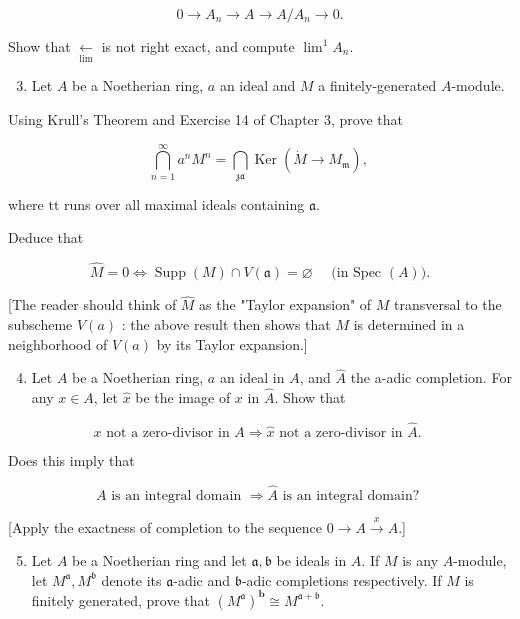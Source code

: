 \documentclass{standalone}
\theoremstyle{definition}
\theoremstyle{remark}
\begin{document}
\[
0 \rightarrow A_{n} \rightarrow A \rightarrow A / A_{n} \rightarrow 0 .
\]

Show that $\underset{\lim }{\longleftarrow}$ is not right exact, and compute $\lim ^{1} A_{n}$.

\begin{enumerate}
  \setcounter{enumi}{2}
  \item Let $A$ be a Noetherian ring, $a$ an ideal and $M$ a finitely-generated $A$-module.
\end{enumerate}

Using Krull's Theorem and Exercise 14 of Chapter 3, prove that

\[
\bigcap_{n=1}^{\infty} a^{n} M^{n}=\bigcap_{\mathfrak{z} \mathfrak{a}} \operatorname{Ker}\left(\dot{M} \rightarrow M_{\mathfrak{m}}\right) \text {, }
\]

where $\mathrm{tt}$ runs over all maximal ideals containing $\mathfrak{a}$.

Deduce that

\[
\hat{M}=0 \Leftrightarrow \operatorname{Supp}(M) \cap V(\mathfrak{a})=\varnothing \quad \text { (in Spec }(A)) .
\]

[The reader should think of $\hat{M}$ as the "Taylor expansion" of $M$ transversal to the subscheme $V(a)$ : the above result then shows that $M$ is determined in a neighborhood of $V(a)$ by its Taylor expansion.]

\begin{enumerate}
  \setcounter{enumi}{3}
  \item Let $A$ be a Noetherian ring, $a$ an ideal in $A$, and $\hat{A}$ the a-adic completion. For any $x \in A$, let $\hat{x}$ be the image of $x$ in $\hat{A}$. Show that
\end{enumerate}

\[
x \text { not a zero-divisor in } A \Rightarrow \hat{x} \text { not a zero-divisor in } \hat{A} \text {. }
\]

Does this imply that

\[
A \text { is an integral domain } \Rightarrow \hat{A} \text { is an integral domain? }
\]

[Apply the exactness of completion to the sequence $0 \rightarrow A \stackrel{x}{\rightarrow} A$.]

\begin{enumerate}
  \setcounter{enumi}{4}
  \item Let $A$ be a Noetherian ring and let $\mathfrak{a}, \mathfrak{b}$ be ideals in $A$. If $M$ is any $A$-module, let $M^{\mathfrak{a}}, M^{\mathfrak{b}}$ denote its $\mathfrak{a}$-adic and $\mathfrak{b}$-adic completions respectively. If $M$ is finitely generated, prove that $\left(M^{\mathfrak{a}}\right)^{\mathbf{b}} \cong M^{\mathfrak{a}+\mathfrak{b}}$.
\end{enumerate}
\end{document}
